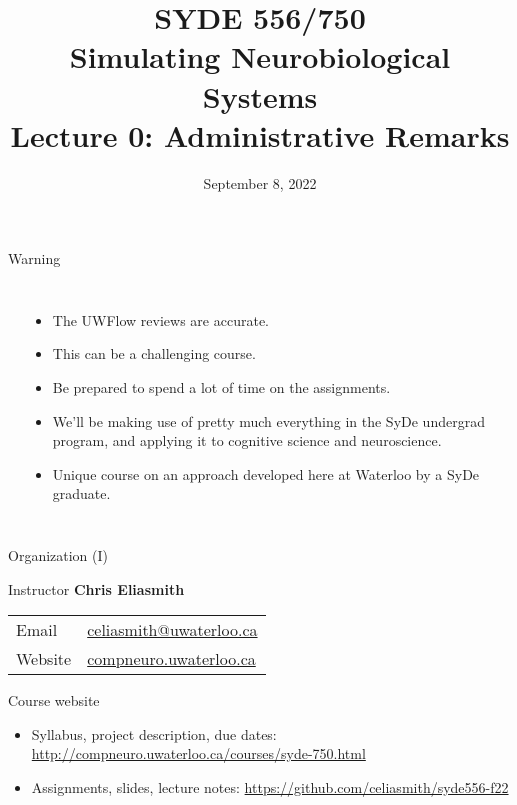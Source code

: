 \documentclass[aspectratio=169]{beamer}
\date{September 8, 2022}
\title{SYDE 556/750 \\ Simulating Neurobiological Systems \\ Lecture 0: Administrative Remarks}
\begin{document}
	
\begin{frame}{}
	\MakeTitle
\end{frame}

\begin{frame}{Warning}
	\begin{columns}[T]
		\fboxrule=0.4pt\fboxsep=0pt\\
		\begin{itemize}
			\item The UWFlow reviews are accurate. 
			\item This can be a challenging course.
			\item Be prepared to spend a lot of time on the assignments.
			\item We'll be making use of pretty much everything in the SyDe undergrad
			      program, and applying it to cognitive science and neuroscience.
			\item Unique course on an approach developed here at Waterloo by a SyDe graduate.
		\end{itemize}
	\end{columns}
\end{frame}

\begin{frame}{Organization (I)}
	\begin{block}{Instructor}
		\vspace{2mm}
		\textbf{Chris Eliasmith}\\[2mm]
		\hspace{-2.5mm}\begin{tabular}{l l}
			Email & \url{celiasmith@uwaterloo.ca}\\
			Website & \url{compneuro.uwaterloo.ca}\\
		\end{tabular}
	\end{block}
 
	\vfill

	\begin{block}{Course website}
		\begin{itemize}
      \item Syllabus, project description, due dates: \url{http://compneuro.uwaterloo.ca/courses/syde-750.html}
			\item Assignments, slides, lecture notes: \url{https://github.com/celiasmith/syde556-f22}
		\end{itemize}
	\end{block}
\end{frame}
\end{document}
